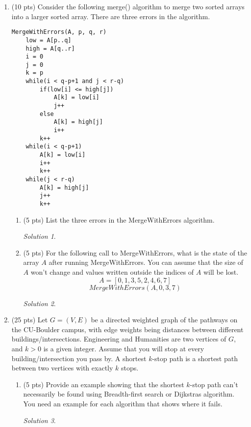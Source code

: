 \documentclass[12pt]{article}
\theoremstyle{remark}
\newtheorem*{solution}{Solution}
\begin{document}
\begin{enumerate}
\item (10 pts) Consider the following merge() algorithm to merge two sorted arrays into a larger sorted array. There are three errors in the algorithm. 
\begin{verbatim}
MergeWithErrors(A, p, q, r)
    low = A[p..q]
    high = A[q..r]
    i = 0
    j = 0
    k = p
    while(i < q-p+1 and j < r-q)
        if(low[i] <= high[j])
            A[k] = low[i]
            j++
        else
            A[k] = high[j]
            i++
        k++
    while(i < q-p+1)
        A[k] = low[i]
        i++
        k++
    while(j < r-q)
        A[k] = high[j]
        j++
        k++
\end{verbatim}
\begin{enumerate}
    \item (5 pts) List the three errors in the MergeWithErrors algorithm.
    \begin{solution}
    
    \end{solution}
    \pagebreak
    
    \item (5 pts) For the following call to MergeWithErrors, what is the state of the array $A$ after running MergeWithErrors. You can assume that the size of $A$ won't change and values written outside the indices of $A$ will be lost.
    \\ $$A=[0,1,3,5,2,4,6,7]$$
     $$MergeWithErrors(A, 0, 3, 7)$$
    \begin{solution}
    
    \end{solution}
    \pagebreak
    
\end{enumerate}


\item (25 pts) Let $G=(V,E)$ be a directed weighted graph of the pathways on the CU-Boulder campus, with edge weights being distances between different buildings/intersections. Engineering and Humanities are two vertices of $G$, and $k>0$ is a given integer. Assume that you will stop at every building/intersection you pass by. A shortest $k$-stop path is a shortest path between two vertices with exactly $k$ stops.
\begin{enumerate}
    \item (5 pts) Provide an example showing that the shortest $k$-stop path can't necessarily be found using Breadth-first search or Dijkstras algorithm. You need an example for each algorithm that shows where it fails.
    \begin{solution}
    

\end{solution}
\end{enumerate}
\end{enumerate}
\end{document}
